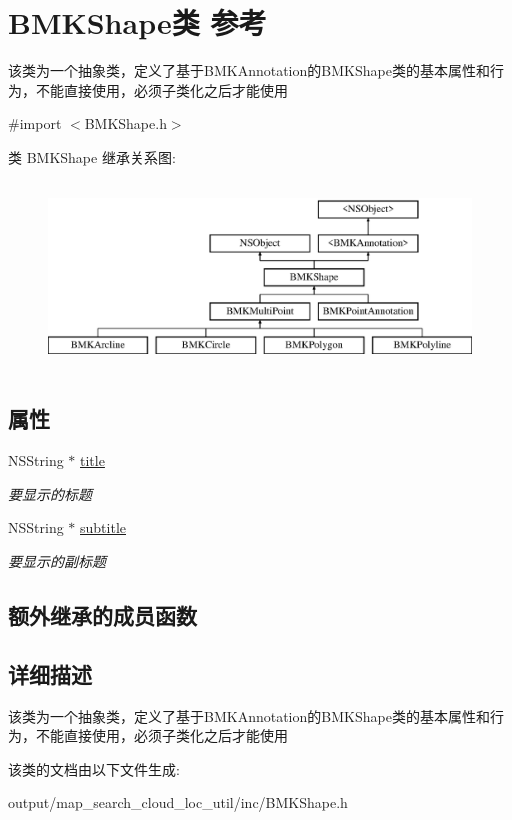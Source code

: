 \hypertarget{interface_b_m_k_shape}{\section{B\+M\+K\+Shape类 参考}
\label{interface_b_m_k_shape}
}


该类为一个抽象类，定义了基于\+B\+M\+K\+Annotation的\+B\+M\+K\+Shape类的基本属性和行为，不能直接使用，必须子类化之后才能使用  




{\ttfamily \#import $<$B\+M\+K\+Shape.\+h$>$}

类 B\+M\+K\+Shape 继承关系图\+:\begin{figure}[H]
\begin{center}
\leavevmode
\includegraphics[height=5.000000cm]{interface_b_m_k_shape}
\end{center}
\end{figure}
\subsection*{属性}
\begin{DoxyCompactItemize}
\item 
\hypertarget{interface_b_m_k_shape_a64da6d2885114c0c2da35aa1ffec925d}{N\+S\+String $\ast$ \hyperlink{interface_b_m_k_shape_a64da6d2885114c0c2da35aa1ffec925d}{title}}\label{interface_b_m_k_shape_a64da6d2885114c0c2da35aa1ffec925d}

\begin{DoxyCompactList}\small\item\em 要显示的标题 \end{DoxyCompactList}\item 
\hypertarget{interface_b_m_k_shape_ae588ba39a27b52bcaed14d40e6494398}{N\+S\+String $\ast$ \hyperlink{interface_b_m_k_shape_ae588ba39a27b52bcaed14d40e6494398}{subtitle}}\label{interface_b_m_k_shape_ae588ba39a27b52bcaed14d40e6494398}

\begin{DoxyCompactList}\small\item\em 要显示的副标题 \end{DoxyCompactList}\end{DoxyCompactItemize}
\subsection*{额外继承的成员函数}


\subsection{详细描述}
该类为一个抽象类，定义了基于\+B\+M\+K\+Annotation的\+B\+M\+K\+Shape类的基本属性和行为，不能直接使用，必须子类化之后才能使用 

该类的文档由以下文件生成\+:\begin{DoxyCompactItemize}
\item 
output/map\+\_\+search\+\_\+cloud\+\_\+loc\+\_\+util/inc/B\+M\+K\+Shape.\+h\end{DoxyCompactItemize}
